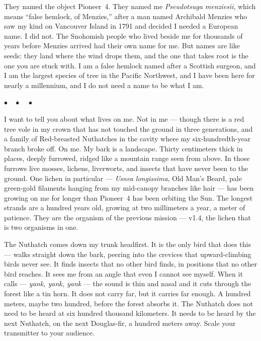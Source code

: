 \documentclass[12pt, letterpaper]{article}
\begin{document}
They named the object Pioneer~4. They named me \textit{Pseudotsuga menziesii}, which means ``false hemlock, of Menzies,'' after a man named Archibald Menzies who saw my kind on Vancouver Island in 1791 and decided I needed a European name. I did not. The Snohomish people who lived beside me for thousands of years before Menzies arrived had their own name for me. But names are like seeds: they land where the wind drops them, and the one that takes root is the one you are stuck with. I am a false hemlock named after a Scottish surgeon, and I am the largest species of tree in the Pacific Northwest, and I have been here for nearly a millennium, and I do not need a name to be what I am.

\begin{center}
$\bullet\quad\bullet\quad\bullet$
\end{center}

I want to tell you about what lives on me. Not in me --- though there is a red tree vole in my crown that has not touched the ground in three generations, and a family of Red-breasted Nuthatches in the cavity where my six-hundredth-year branch broke off. On me. My bark is a landscape. Thirty centimeters thick in places, deeply furrowed, ridged like a mountain range seen from above. In those furrows live mosses, lichens, liverworts, and insects that have never been to the ground. One lichen in particular --- \textit{Usnea longissima}, Old Man's Beard, pale green-gold filaments hanging from my mid-canopy branches like hair --- has been growing on me for longer than Pioneer~4 has been orbiting the Sun. The longest strands are a hundred years old, growing at two millimeters a year, a meter of patience. They are the organism of the previous mission --- v1.4, the lichen that is two organisms in one.

The Nuthatch comes down my trunk headfirst. It is the only bird that does this --- walks straight down the bark, peering into the crevices that upward-climbing birds never see. It finds insects that no other bird finds, in positions that no other bird reaches. It sees me from an angle that even I cannot see myself. When it calls --- \textit{yank, yank, yank} --- the sound is thin and nasal and it cuts through the forest like a tin horn. It does not carry far, but it carries far enough. A hundred meters, maybe two hundred, before the forest absorbs it. The Nuthatch does not need to be heard at six hundred thousand kilometers. It needs to be heard by the next Nuthatch, on the next Douglas-fir, a hundred meters away. Scale your transmitter to your audience.
\end{document}
